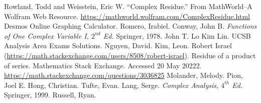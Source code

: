 \documentclass[12pt]{article}
\newcommand{\ita}[1]{\textit{#1}}
\theoremstyle{definition}
\begin{document}
\newpage
{}
{}
\begin{thebibliography}{99}
     Rowland, Todd and Weisstein, Eric W. ``Complex Residue.'' From MathWorld--A Wolfram Web Resource. \url{https://mathworld.wolfram.com/ComplexResidue.html}
     Desmos Online Graphing Calculator.
     Romero, Irabiel.
     Conway, John B. \ita{Functions of One Complex Variable I, $2^{nd}$ Ed.} Springer, 1978.
     John T. Lo Kim Lin. UCSB Analysis Area Exams Solutions. 
     Nguyen, David. 
     Kim, Leon.
     Robert Israel (\url{https://math.stackexchange.com/users/8508/robert-israel}). Residue of a product of series. Mathematics Stack Exchange. Accessed 20 May 20222. \url{https://math.stackexchange.com/questions/3036825}
     Molander, Melody. 
     Pion, Joel E.
     Hong, Christian.
     Tufte, Evan.
     Lang, Serge. \ita{Complex Analysis, $4^{th}$ Ed.} Springer, 1999.
     Russell, Ryan.
\end{thebibliography}
\end{document}
